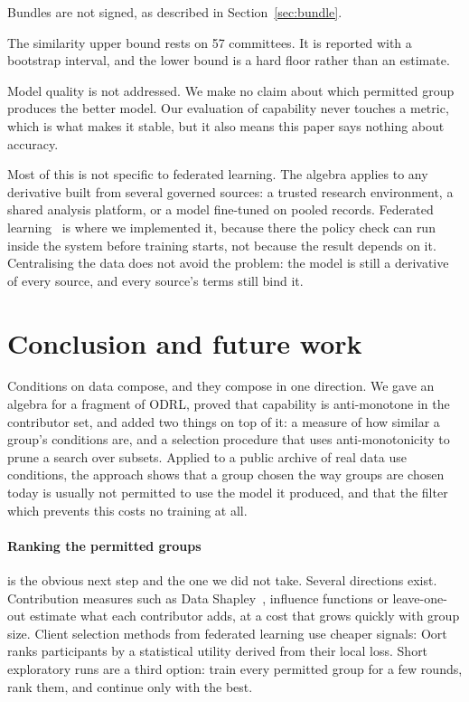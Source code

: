 \documentclass[sigconf,anonymous,review]{acmart}
\begin{document}
Bundles are not signed, as described in Section~\ref{sec:bundle}.

The similarity upper bound rests on 57 committees. It is reported with a bootstrap
interval, and the lower bound is a hard floor rather than an estimate.

Model quality is not addressed. We make no claim about which permitted group
produces the better model. Our evaluation of capability never touches a metric,
which is what makes it stable, but it also means this paper says nothing about
accuracy.

Most of this is not specific to federated learning. The algebra applies to any
derivative built from several governed sources: a trusted research environment, a
shared analysis platform, or a model fine-tuned on pooled records. Federated
learning~\cite{fedavg} is where we implemented it, because there the policy check
can run inside the system before training starts, not because the result depends
on it. Centralising the data does not avoid the problem: the model is still a
derivative of every source, and every source's terms still bind it.

\section{Conclusion and future work}
\label{sec:future}

Conditions on data compose, and they compose in one direction. We gave an algebra
for a fragment of ODRL, proved that capability is anti-monotone in the contributor
set, and added two things on top of it: a measure of how similar a group's
conditions are, and a selection procedure that uses anti-monotonicity to prune a
search over subsets. Applied to a public archive of real data use conditions, the
approach shows that a group chosen the way groups are chosen today is usually not
permitted to use the model it produced, and that the filter which prevents this
costs no training at all.

\paragraph{Ranking the permitted groups} is the obvious next step and the one we
did not take. Several directions exist. Contribution measures such as Data
Shapley~\cite{datashapley}, influence functions or leave-one-out estimate what
each contributor adds, at a cost that grows quickly with group size. Client
selection methods from federated learning use cheaper signals: Oort~\cite{oort}
ranks participants by a statistical utility derived from their local loss. Short
exploratory runs are a third option: train every permitted group for a few rounds,
rank them, and continue only with the best.
\end{document}
